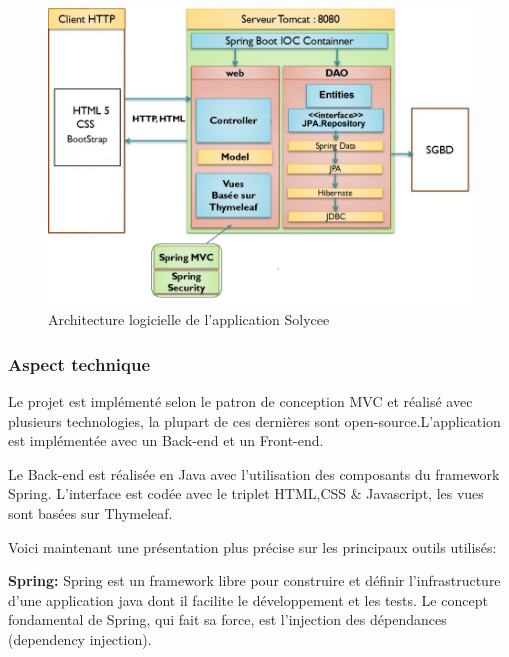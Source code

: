 \documentclass[12pt]{article}
\begin{document}
\begin{figure}[H]
    \centering
    \includegraphics[width=0.9 \textwidth]{diagrammes/archiSolycee.png}
    \caption{Architecture logicielle de l'application Solycee }
\end{figure}

\subsubsection{Aspect technique}

Le projet est implémenté selon le patron de conception MVC et réalisé avec plusieurs technologies, la plupart de ces dernières sont open-source.L'application est implémentée avec un Back-end et un Front-end.

Le Back-end est réalisée en Java avec l'utilisation des composants du framework Spring. L'interface est codée avec le triplet HTML,CSS \& Javascript, les vues sont basées sur Thymeleaf. 

Voici maintenant une présentation plus précise sur les principaux outils utilisés:\newline

\textbf{Spring:} Spring est un framework libre pour construire et définir l'infrastructure d'une application java dont il facilite le développement et les tests. Le concept fondamental de Spring, qui fait sa force, est l'injection des dépendances (dependency injection).\newline
\end{document}
